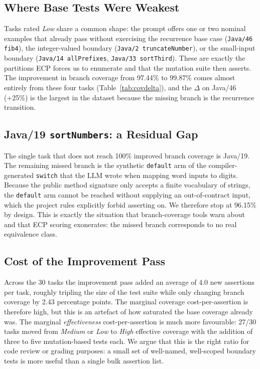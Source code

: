 \documentclass[journal]{IEEEtran}
\begin{document}
\subsection{Where Base Tests Were Weakest}
Tasks rated \emph{Low} share a common shape: the prompt
offers one or two nominal examples that already pass without
exercising the recurrence base case (\texttt{Java/46 fib4}),
the integer-valued boundary
(\texttt{Java/2 truncateNumber}), or the small-input boundary
(\texttt{Java/14 allPrefixes}, \texttt{Java/33 sortThird}).
These are exactly the partitions ECP forces us to enumerate
and that the mutation suite then asserts. The improvement in
branch coverage from 97.44\% to 99.87\% comes almost entirely
from these four tasks (Table~\ref{tab:covdelta}), and the
$\Delta$ on Java/46 (+25\%) is the largest in the dataset
because the missing branch is the recurrence transition.

\subsection{Java/19 \texttt{sortNumbers}: a Residual Gap}
The single task that does not reach 100\% improved branch
coverage is Java/19. The remaining missed branch is the
synthetic \texttt{default} arm of the compiler-generated
\texttt{switch} that the LLM wrote when mapping word inputs
to digits. Because the public method signature only accepts a
finite vocabulary of strings, the \texttt{default} arm cannot
be reached without supplying an out-of-contract input, which
the project rules explicitly forbid asserting on. We
therefore stop at 96.15\% by design. This is exactly the
situation that branch-coverage tools warn about and that ECP
scoring exonerates: the missed branch corresponds to no real
equivalence class.

\subsection{Cost of the Improvement Pass}
Across the 30 tasks the improvement pass added an average of
4.0 new assertions per task, roughly tripling the size of the
test suite while only changing branch coverage by 2.43
percentage points. The marginal coverage cost-per-assertion
is therefore high, but this is an artefact of how saturated
the base coverage already was. The marginal
\emph{effectiveness} cost-per-assertion is much more
favourable: 27/30 tasks moved from \emph{Medium} or
\emph{Low} to \emph{High} effective coverage with the
addition of three to five mutation-based tests each. We argue
that this is the right ratio for code review or grading
purposes: a small set of well-named, well-scoped boundary
tests is more useful than a single bulk assertion list.
\end{document}

